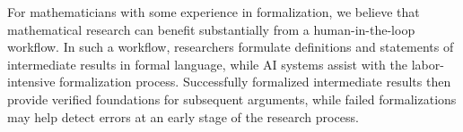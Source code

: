 \documentclass[english,oneside]{smfart}
\begin{document}
For mathematicians with some experience in formalization, we believe that mathematical research can benefit substantially from a human-in-the-loop workflow. In such a workflow, researchers formulate definitions and statements of intermediate results in formal language, while AI systems assist with the labor-intensive formalization process. Successfully formalized intermediate results then provide verified foundations for subsequent arguments, while failed formalizations may help detect errors at an early stage of the research process.
\fi
\printbibliography
\end{document}
